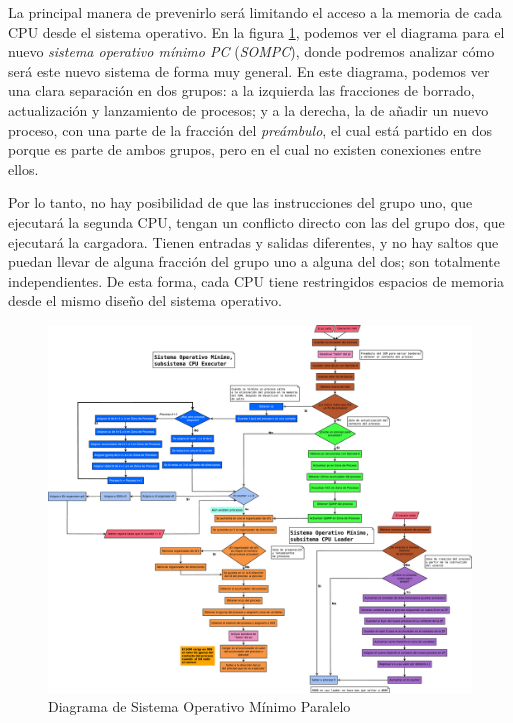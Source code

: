 \documentclass[letterpaper,12pt,oneside]{book}
\begin{document}
	 		La principal manera de prevenirlo será limitando el acceso a la memoria de cada CPU desde el sistema operativo. En la figura 
	 		\ref{fig:diag_so_parallel},
	 		podemos ver el diagrama para el nuevo 
	 		\textit{sistema operativo mínimo PC} (\textit{SOMPC}), donde podremos analizar cómo será este nuevo sistema de forma muy 
	 		general. En este diagrama, podemos ver una clara separación en dos grupos: a la izquierda
	 		las fracciones de borrado, actualización y lanzamiento de procesos; y a la derecha, la de añadir un nuevo proceso, con una parte de la 
	 		fracción
	 		del \textit{preámbulo}, el cual está partido en dos porque es parte de ambos grupos, pero en el cual
	 		no existen conexiones entre ellos.

	 		Por lo tanto, no hay posibilidad de que las instrucciones
	 		del grupo uno, que ejecutará la segunda CPU, tengan un conflicto directo con las del grupo dos, que ejecutará la cargadora. 
	 		Tienen entradas y salidas diferentes, y no hay saltos que puedan llevar de alguna fracción del grupo uno a alguna
	 		del dos; son totalmente independientes. De esta forma, cada CPU tiene restringidos espacios de memoria desde el mismo diseño 
	 		del sistema operativo.
	 		
	 		

			\begin{figure}[h]		
				\centering
				\includegraphics[width=\textwidth,height=\textheight,keepaspectratio]{media/Paralela/Diagrama_Flujo_SO_Parallel.eps}
				\caption{ Diagrama de Sistema Operativo Mínimo Paralelo }
				\label{fig:diag_so_parallel}
			\end{figure}	 	
	 	
\end{document}
